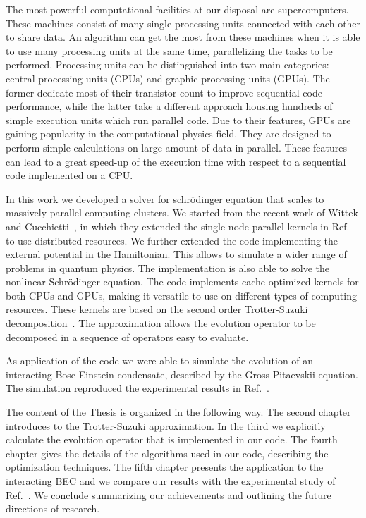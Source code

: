 The most powerful computational facilities at our disposal are supercomputers. These machines consist of many single processing units connected with each other to share data. An algorithm can get the most from these machines when it is able to use many processing units at the same time, parallelizing the tasks to be performed. Processing units can be distinguished into two main categories: central processing units (CPUs) and graphic processing units (GPUs). The former dedicate most of their transistor count to improve sequential code performance, while the latter take a different approach housing hundreds of simple execution units which run parallel code. Due to their features, GPUs are gaining popularity in the computational physics field. They are designed to perform simple calculations on large amount of data in parallel. These features can lead to a great speed-up of the execution time with respect to a sequential code implemented on a CPU.

In this work we developed a solver for schr\"odinger equation that scales to	massively parallel computing clusters. We started from the recent work of Wittek and Cucchietti~\citep{Wittek20131165}, in which they extended the single-node parallel kernels in Ref.~\citep{bederian2011boosting} to use distributed resources. We further extended the code implementing the external potential in the Hamiltonian. This allows to simulate a wider range of problems in quantum physics. The implementation is also able to solve the nonlinear Schr\"odinger equation. The code implements cache optimized kernels for both CPUs and GPUs, making it versatile to use on different types of computing resources. These kernels are based on the second order Trotter-Suzuki decomposition~\citep{Suzuki1992387}. The approximation allows the evolution operator to be decomposed in a sequence of operators easy to evaluate.

As application of the code we were able to simulate the evolution of an interacting Bose-Einstein condensate, described by the Gross-Pitaevskii equation. The simulation reproduced the experimental results in Ref.~\citep{DSF00}.

The content of the Thesis is organized in the following way. The second chapter introduces to the Trotter-Suzuki approximation. In the third we explicitly calculate the evolution operator that is implemented in our code. The fourth chapter gives the details of the algorithms used in our code, describing the optimization techniques. The fifth chapter presents the application to the interacting BEC and we compare our results with the experimental study of Ref.~\citep{DSF00}. We conclude summarizing our achievements and outlining the future directions of research.